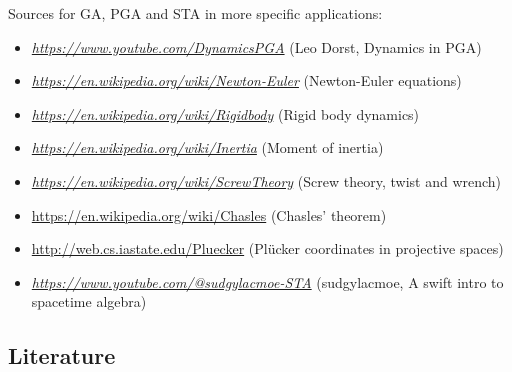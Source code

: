 Sources for GA, PGA and STA in more specific applications:
\begin{itemize}
    \scriptsize
    \item
    \href{https://www.youtube.com/watch?v=v-WG02ILMXA&t=1476s}{\textit{https://www.youtube.com/DynamicsPGA}}
    (Leo Dorst, Dynamics in PGA)
    \item
    \href{https://en.wikipedia.org/wiki/Newton–Euler_equations}{\textit{https://en.wikipedia.org/wiki/Newton-Euler}}
    (Newton-Euler equations)
    \item
    \href{https://en.wikipedia.org/wiki/Euler%27s_equations_(rigid_body_dynamics)}{\textit{https://en.wikipedia.org/wiki/Rigidbody}}
    (Rigid body dynamics)
    \item
    \href{https://en.wikipedia.org/wiki/Moment_of_inertia}{\textit{https://en.wikipedia.org/wiki/Inertia}}
    (Moment of inertia)
    \item
    \href{https://en.wikipedia.org/wiki/Screw_theory#Wrench}{\textit{https://en.wikipedia.org/wiki/ScrewTheory}}
    (Screw theory, twist and wrench)
    \item
    \href{https://en.wikipedia.org/wiki/Chasles%27_theorem_(kinematics)}{{https://en.wikipedia.org/wiki/Chasles}}
    (Chasles' theorem)
    \item
    \href{http://web.cs.iastate.edu/~cs577/handouts/plucker-coordinates.pdf}{{http://web.cs.iastate.edu/Pluecker}}
    (Plücker coordinates in projective spaces)
        \item
    \href{https://www.youtube.com/watch?v=e7aIVSVc8cI&list=PLVuwZXwFua-2nUoECBT-y1egzZN5PA4bL&index=6}{\textit{https://www.youtube.com/@sudgylacmoe-STA}}
    (sudgylacmoe, A swift intro to spacetime algebra)

\end{itemize}

\newpage

\subsection{Literature}
\label{literature}



